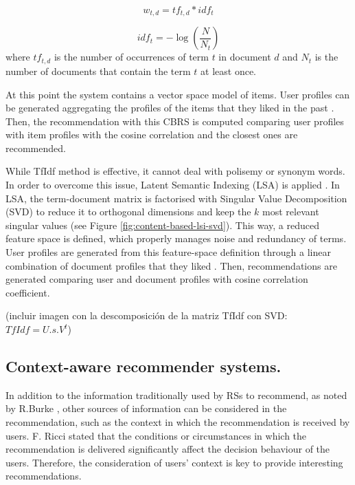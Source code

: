 \documentclass[preprint]{elsarticle}
\begin{document}
\begin{spacing}{1.5}
\begin{equation}
	w_{t,d} = tf_{t,d}*idf_{t}
	\label{eq:document-profile-tfidf-term-weights}
\end{equation}

\begin{equation}
	idf_t = -\log \left( \frac{N}{N_t}\right)
	\label{eq:document-profile-tfidf-idf}
\end{equation}
\noindent where $tf_{t,d}$ is the number of occurrences of term $t$ in document $d$ and $N_t$ is the number of documents that contain the term $t$ at least once.

At this point the system contains a vector space model of items. User profiles can be generated aggregating the profiles of the items that they liked in the past \cite{Symeonidis2007}. Then, the recommendation with this CBRS is computed comparing user profiles with item profiles with the cosine correlation and the closest ones are recommended. 

While TfIdf method is effective, it cannot deal with polisemy or synonym words. In order to overcome this issue, Latent Semantic Indexing (LSA) is applied \cite{deGemmis2015}. In LSA, the term-document matrix is factorised with Singular Value Decomposition (SVD) to reduce it to orthogonal dimensions and keep the $k$ most relevant singular values (see Figure \ref{fig:content-based-lsi-svd}). This way, a reduced feature space is defined, which properly manages noise and redundancy of terms. User profiles are generated from this feature-space definition through a linear combination of document profiles that they liked \cite{Bambini2011}. Then, recommendations are generated comparing user and document profiles with cosine correlation coefficient.

(incluir imagen con la descomposición de la matriz TfIdf con SVD: $TfIdf=U.s.V^t$)

\subsection{Context-aware recommender systems.}

In addition to the information traditionally used by RSs to recommend, as noted by R.Burke \cite{Burke2002}, other sources of information can be considered in the recommendation, such as the context in which the recommendation is received by users. F. Ricci \cite{Ricci2012contextualizing} stated that the conditions or circumstances in which the recommendation is delivered significantly affect the decision behaviour of the users. Therefore, the consideration of users' context is key to provide interesting recommendations.


\end{spacing}
\end{document}
